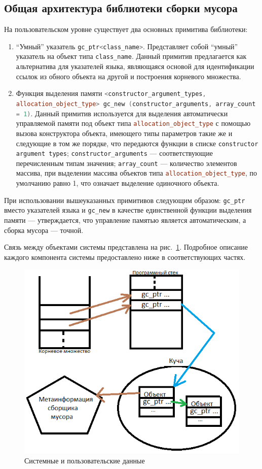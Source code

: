 \subsection{Общая архитектура библиотеки сборки мусора}
На пользовательском уровне существует два основных примитива библиотеки:
\begin{enumerate}
\item ``Умный'' указатель \lstinline[language= cpp]{gc_ptr<class_name>}. Представляет собой ``умный'' указатель на объект типа
	\lstinline[language= cpp]{class_name}.
	Данный примитив предлагается как альтернатива для указателей языка, являющаяся основой для идентификации ссылок из
	обного объекта на другой и построения корневого множества.
\item Функция выделения памяти \sloppy\lstinline[language= cpp]{<constructor_argument_types, allocation_object_type> gc_new (constructor_arguments, array_count = 1)}. Данный примитив используется для выделения автоматически управляемой памяти под объект типа \lstinline[language= cpp]{allocation_object_type} с помощью вызова конструктора объекта, имеющего типы параметров такие же и следующие в том же порядке, что передаются функции в списке \lstinline[language= cpp]{constructor argument types};
	\lstinline[language= cpp]{constructor_arguments} --- соответствующие перечисленным типам значения;
	\lstinline[language= cpp]{array_count} --- количество элементов массива, при выделении массива объектов типа
	\lstinline[language= cpp]{allocation_object_type}, по умолчанию равно 1, что означает выделение одиночного объекта.
\end{enumerate}
При использовании вышеуказанных примитивов следующим образом: \lstinline[language= cpp]{gc_ptr} вместо указателей языка и
\lstinline[language= cpp]{gc_new} в качестве единственной функции выделения памяти --- утверждается,
что управление памятью является автоматическим, а сборка мусора --- точной.

Связь между объектами системы представлена на рис.~\ref{fig:systemArch}. Подробное описание каждого компонента системы предоставлено
ниже в соответствующих частях.

\begin{figure}[t]
	\centering
	\includegraphics[width=0.8\linewidth]{Berezun/images/systemArch.png}
	\caption{Системные и пользовательские данные}
	\label{fig:systemArch}
\end{figure}

